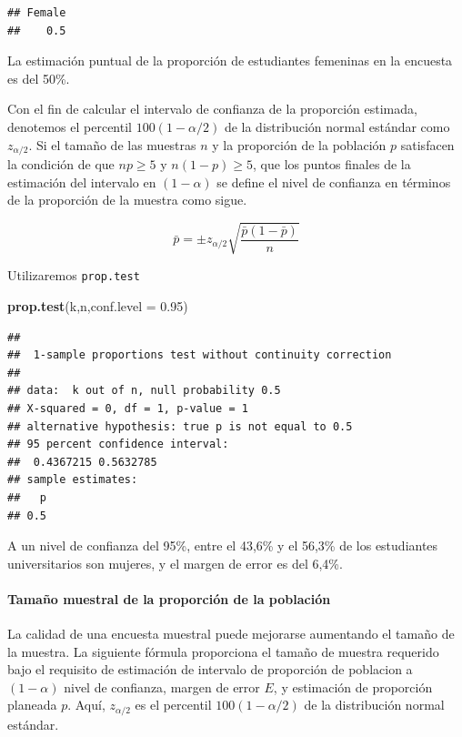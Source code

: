 \documentclass[]{article}
\newenvironment{Shaded}{\begin{snugshade}}{\end{snugshade}}
\newcommand{\KeywordTok}[1]{\textcolor[rgb]{0.13,0.29,0.53}{\textbf{{#1}}}}
\newcommand{\DataTypeTok}[1]{\textcolor[rgb]{0.13,0.29,0.53}{{#1}}}
\newcommand{\FloatTok}[1]{\textcolor[rgb]{0.00,0.00,0.81}{{#1}}}
\newcommand{\NormalTok}[1]{{#1}}
\numberwithin{equation}{section}
\begin{document}
\begin{verbatim}
## Female 
##    0.5
\end{verbatim}

La estimación puntual de la proporción de estudiantes femeninas en la
encuesta es del 50\%.

Con el fin de calcular el intervalo de confianza de la proporción
estimada, denotemos el percentil \(100(1-\alpha/2)\) de la distribución
normal estándar como \(z_{\alpha/2}\). Si el tamaño de las muestras
\(n\) y la proporción de la población \(p\) satisfacen la condición de
que \(np \geq 5\) y \(n (1-p) \geq 5\), que los puntos finales de la
estimación del intervalo en \((1-\alpha)\) se define el nivel de
confianza en términos de la proporción de la muestra como sigue.

\[
      \bar{p} = \pm z_{\alpha/2} \sqrt{\frac{\bar{p}(1-\bar{p})}{n}} 
\]

Utilizaremos \texttt{prop.test}

\begin{Shaded}
\begin{Highlighting}[]
\KeywordTok{prop.test}\NormalTok{(k,n,}\DataTypeTok{conf.level =} \FloatTok{0.95}\NormalTok{)}
\end{Highlighting}
\end{Shaded}

\begin{verbatim}
## 
##  1-sample proportions test without continuity correction
## 
## data:  k out of n, null probability 0.5
## X-squared = 0, df = 1, p-value = 1
## alternative hypothesis: true p is not equal to 0.5
## 95 percent confidence interval:
##  0.4367215 0.5632785
## sample estimates:
##   p 
## 0.5
\end{verbatim}

A un nivel de confianza del 95\%, entre el 43,6\% y el 56,3\% de los
estudiantes universitarios son mujeres, y el margen de error es del
6,4\%.

\paragraph{Tamaño muestral de la proporción de la
población}\label{tamano-muestral-de-la-proporcion-de-la-poblacion}

La calidad de una encuesta muestral puede mejorarse aumentando el tamaño
de la muestra. La siguiente fórmula proporciona el tamaño de muestra
requerido bajo el requisito de estimación de intervalo de proporción de
poblacion a \((1-\alpha)\) nivel de confianza, margen de error \(E\), y
estimación de proporción planeada \(p\). Aquí, \(z_{\alpha/2}\) es el
percentil \(100(1-\alpha/2)\) de la distribución normal estándar.
\end{document}
